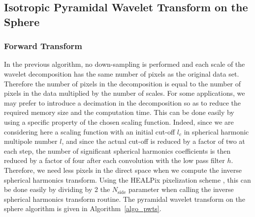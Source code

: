 
\subsection{Isotropic Pyramidal Wavelet Transform on the Sphere}

\subsubsection{Forward Transform}
In the previous algorithm, no down-sampling is performed and each scale of the wavelet decomposition has the same number of pixels 
as the original data set. Therefore the number of pixels in the decomposition is equal to the number of pixels in the data multiplied 
by the number of scales. For some applications, we may prefer to introduce a decimation in the decomposition so as to reduce the 
required memory size and the computation time. This can be done easily by using a specific property of the chosen scaling function.
Indeed, since we are considering here a scaling function with an initial cut-off $l_c$ in spherical harmonic multipole number $l$, 
and since the actual cut-off is reduced by a factor of two at each step, the number of significant spherical harmonics coefficients 
is then reduced by a factor of four after each convolution with the low pass filter $h$. Therefore, we need less pixels in the direct 
space when we compute the inverse spherical harmonics transform. Using the HEALPix pixelization scheme \citep{pixel:healpix}, 
this can be done easily by dividing by 2 the $N_{\mathrm{side}}$ parameter when calling the inverse spherical harmonics transform routine.
The pyramidal wavelet transform on the sphere algorithm is given in Algorithm~\ref{algo_pwts}.

